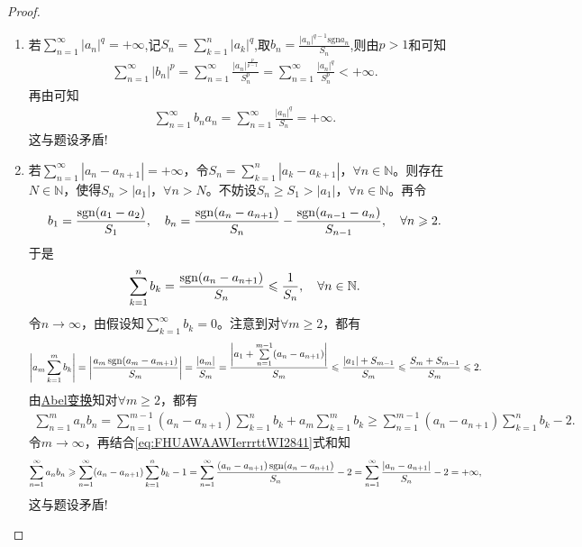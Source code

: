 \documentclass[../../main.tex]{subfiles}%
\begin{document}
\begin{proof}
\begin{enumerate}[(1)]
\item 若$\sum_{n=1}^{\infty}{| a_n |^q}=+\infty$,记$S_n=\sum_{k=1}^n{| a_k |^q}$,取$b_n=\frac{| a_n |^{q-1}\mathrm{sgn} a_n}{S_n}$,则由$p>1$和可知
\begin{align*}
\sum_{n=1}^{\infty}{| b_n |^p}=\sum_{n=1}^{\infty}{\frac{| a_n |^{\frac{p}{p-1}}}{S_{n}^{p}}}=\sum_{n=1}^{\infty}{\frac{| a_n |^q}{S_{n}^{p}}}<+\infty.
\end{align*}
再由可知
\begin{align*}
\sum_{n=1}^{\infty}{b_n a_n}=\sum_{n=1}^{\infty}{\frac{| a_n |^q}{S_n}}=+\infty.
\end{align*}
这与题设矛盾!

\item 若$\sum\limits_{n=1}^{\infty} |a_n - a_{n+1}| = +\infty$，令$S_n = \sum\limits_{k=1}^{n} |a_k - a_{k+1}|$，$\forall n\in \mathbb{N}$。则存在$N\in \mathbb{N}$，使得$S_n > |a_1|$，$\forall n > N$。不妨设$S_n \geqslant S_1 > |a_1|$，$\forall n\in \mathbb{N}$。再令
\begin{align*}
b_1 = \frac{\operatorname{sgn} (a_1 - a_2)}{S_1},\quad b_n = \frac{\operatorname{sgn} (a_n - a_{n+1})}{S_n} - \frac{\operatorname{sgn} (a_{n-1} - a_n)}{S_{n-1}},\quad \forall n\geqslant 2.
\end{align*}
于是
\begin{align*}
\sum\limits_{k=1}^{n} b_k = \frac{\operatorname{sgn} (a_n - a_{n+1})}{S_n} \leqslant \frac{1}{S_n},\quad \forall n\in \mathbb{N}.
\end{align*}
令$n\to\infty$，由假设知$\sum\limits_{k=1}^{\infty} b_k = 0$。注意到对$\forall m\geqslant 2$，都有
\begin{align}
\left| a_m \sum\limits_{k=1}^{m} b_k \right| = \left| \frac{a_m \operatorname{sgn} (a_m - a_{m+1})}{S_m} \right| = \frac{|a_m|}{S_m} = \frac{\left| a_1 + \sum\limits_{n=1}^{m-1} (a_n - a_{n+1}) \right|}{S_m} \leqslant \frac{|a_1| + S_{m-1}}{S_m} \leqslant\frac{S_m + S_{m-1}}{S_m}  \leqslant 2.
\label{eq:FHUAWAAWIerrrttWI2841}
\end{align}
由\hyperref[theorem:Abel变换]{Abel变换}知对$\forall m\geqslant 2$，都有
\begin{align*}
\sum\limits_{n=1}^{m} a_n b_n = \sum\limits_{n=1}^{m-1} (a_n - a_{n+1}) \sum\limits_{k=1}^{n} b_k + a_m \sum\limits_{k=1}^{m} b_k \geqslant \sum\limits_{n=1}^{m-1} (a_n - a_{n+1}) \sum\limits_{k=1}^{n} b_k - 2.
\end{align*}
令$m\to\infty$，再结合\eqref{eq:FHUAWAAWIerrrttWI2841}式和知
\begin{align*}
\sum\limits_{n=1}^{\infty} a_n b_n \geqslant \sum\limits_{n=1}^{\infty} (a_n - a_{n+1}) \sum\limits_{k=1}^{n} b_k - 1 = \sum\limits_{n=1}^{\infty} \frac{(a_n - a_{n+1}) \operatorname{sgn} (a_n - a_{n+1})}{S_n} - 2 = \sum\limits_{n=1}^{\infty} \frac{|a_n - a_{n+1}|}{S_n} - 2 = +\infty,
\end{align*}
这与题设矛盾!
\end{enumerate}
\end{proof}
\end{document}
